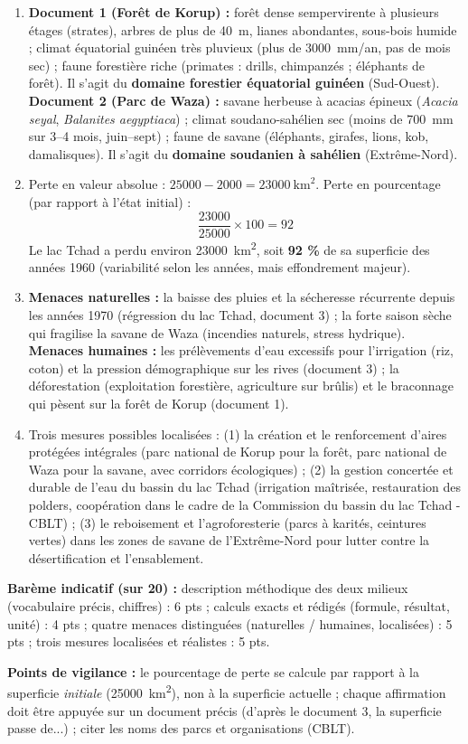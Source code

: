 \documentclass[11pt]{article}
\begin{document}
\begin{corrige}
\begin{enumerate}
\item \textbf{Document 1 (Forêt de Korup) :} forêt dense sempervirente à plusieurs étages (strates), arbres de plus de \SI{40}{m}, lianes abondantes, sous-bois humide ; climat équatorial guinéen très pluvieux (plus de \SI{3000}{mm/an}, pas de mois sec) ; faune forestière riche (primates : drills, chimpanzés ; éléphants de forêt). Il s'agit du \textbf{domaine forestier équatorial guinéen} (Sud-Ouest). \textbf{Document 2 (Parc de Waza) :} savane herbeuse à acacias épineux (\emph{Acacia seyal}, \emph{Balanites aegyptiaca}) ; climat soudano-sahélien sec (moins de \SI{700}{mm} sur 3--4 mois, juin--sept) ; faune de savane (éléphants, girafes, lions, kob, damalisques). Il s'agit du \textbf{domaine soudanien à sahélien} (Extrême-Nord).
\item Perte en valeur absolue : $25000 - 2000 = \SI{23000}{\square\km}$. Perte en pourcentage (par rapport à l'état initial) :
\[ \frac{23000}{25000} \times 100 = 92 \]
Le lac Tchad a perdu environ \SI{23000}{\square\km}, soit \textbf{92 \%} de sa superficie des années 1960 (variabilité selon les années, mais effondrement majeur).
\item \textbf{Menaces naturelles :} la baisse des pluies et la sécheresse récurrente depuis les années 1970 (régression du lac Tchad, document 3) ; la forte saison sèche qui fragilise la savane de Waza (incendies naturels, stress hydrique). \textbf{Menaces humaines :} les prélèvements d'eau excessifs pour l'irrigation (riz, coton) et la pression démographique sur les rives (document 3) ; la déforestation (exploitation forestière, agriculture sur brûlis) et le braconnage qui pèsent sur la forêt de Korup (document 1).
\item Trois mesures possibles localisées : (1) la création et le renforcement d'aires protégées intégrales (parc national de Korup pour la forêt, parc national de Waza pour la savane, avec corridors écologiques) ; (2) la gestion concertée et durable de l'eau du bassin du lac Tchad (irrigation maîtrisée, restauration des polders, coopération dans le cadre de la Commission du bassin du lac Tchad - CBLT) ; (3) le reboisement et l'agroforesterie (parcs à karités, ceintures vertes) dans les zones de savane de l'Extrême-Nord pour lutter contre la désertification et l'ensablement.
\end{enumerate}
\textbf{Barème indicatif (sur 20) :} description méthodique des deux milieux (vocabulaire précis, chiffres) : 6 pts ; calculs exacts et rédigés (formule, résultat, unité) : 4 pts ; quatre menaces distinguées (naturelles / humaines, localisées) : 5 pts ; trois mesures localisées et réalistes : 5 pts.

\textbf{Points de vigilance :} le pourcentage de perte se calcule par rapport à la superficie \emph{initiale} (\SI{25000}{\square\km}), non à la superficie actuelle ; chaque affirmation doit être appuyée sur un document précis (\og d'après le document 3, la superficie passe de...\fg) ; citer les noms des parcs et organisations (CBLT).
\end{corrige}
\end{document}
